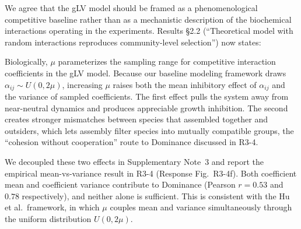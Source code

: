 \responselabel
We agree that the gLV model should be framed as a phenomenological competitive baseline rather than as a mechanistic description of the biochemical interactions operating in the experiments. Results \S2.2 (``Theoretical model with random interactions reproduces community-level selection'') now states: 


\responselabel
Biologically, $\mu$ parameterizes the sampling range for competitive interaction coefficients in the gLV model. Because our baseline modeling framework draws $\alpha_{ij} \sim U(0, 2\mu)$, increasing $\mu$ raises both the mean inhibitory effect of $\alpha_{ij}$ and the variance of sampled coefficients. The first effect pulls the system away from near-neutral dynamics and produces appreciable growth inhibition. The second creates stronger mismatches between species that assembled together and outsiders, which lets assembly filter species into mutually compatible groups, the ``cohesion without cooperation'' route to Dominance discussed in R3-4.

We decoupled these two effects in Supplementary Note~3 and report the empirical mean-vs-variance result in R3-4 (Response Fig.~R3-4f). Both coefficient mean and coefficient variance contribute to Dominance (Pearson $r=0.53$ and $0.78$ respectively), and neither alone is sufficient. This is consistent with the Hu et al.\ framework, in which $\mu$ couples mean and variance simultaneously through the uniform distribution $U(0, 2\mu)$.

